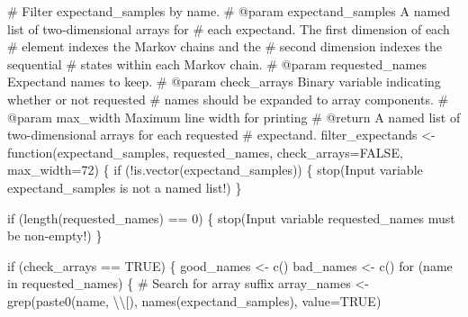 \documentclass[
  letterpaper,
  DIV=11,
  numbers=noendperiod]{scrartcl}
\newenvironment{Shaded}{\begin{snugshade}}{\end{snugshade}}
\newcommand{\CharTok}[1]{\textcolor[rgb]{0.13,0.47,0.30}{#1}}
\newcommand{\CommentTok}[1]{\textcolor[rgb]{0.37,0.37,0.37}{#1}}
\newcommand{\ControlFlowTok}[1]{\textcolor[rgb]{0.00,0.23,0.31}{#1}}
\newcommand{\DecValTok}[1]{\textcolor[rgb]{0.68,0.00,0.00}{#1}}
\newcommand{\KeywordTok}[1]{\textcolor[rgb]{0.00,0.23,0.31}{#1}}
\newcommand{\NormalTok}[1]{\textcolor[rgb]{0.00,0.23,0.31}{#1}}
\newcommand{\OperatorTok}[1]{\textcolor[rgb]{0.37,0.37,0.37}{#1}}
\newcommand{\StringTok}[1]{\textcolor[rgb]{0.13,0.47,0.30}{#1}}
\begin{document}
\begin{Shaded}
\begin{Highlighting}[]
\CommentTok{\# Filter \textasciigrave{}expectand\_samples\textasciigrave{} by name.}
\CommentTok{\# @param expectand\_samples A named list of two{-}dimensional arrays for}
\CommentTok{\#                          each expectand.  The first dimension of each}
\CommentTok{\#                          element indexes the Markov chains and the}
\CommentTok{\#                          second dimension indexes the sequential}
\CommentTok{\#                          states within each Markov chain.}
\CommentTok{\# @param requested\_names Expectand names to keep.}
\CommentTok{\# @param check\_arrays Binary variable indicating whether or not requested}
\CommentTok{\#                     names should be expanded to array components.}
\CommentTok{\# @param max\_width Maximum line width for printing}
\CommentTok{\# @return A named list of two{-}dimensional arrays for each requested}
\CommentTok{\#         expectand.}
\NormalTok{filter\_expectands }\OperatorTok{\textless{}{-}}\NormalTok{ function(expectand\_samples, requested\_names,}
\NormalTok{                              check\_arrays}\OperatorTok{=}\NormalTok{FALSE, max\_width}\OperatorTok{=}\DecValTok{72}\NormalTok{) \{}
  \ControlFlowTok{if}\NormalTok{ (}\OperatorTok{!}\KeywordTok{is}\NormalTok{.vector(expectand\_samples)) \{}
\NormalTok{    stop(}\StringTok{\textquotesingle{}Input variable \textasciigrave{}expectand\_samples\textasciigrave{} is not a named list!\textquotesingle{}}\NormalTok{)}
\NormalTok{  \}}
  
  \ControlFlowTok{if}\NormalTok{ (length(requested\_names) }\OperatorTok{==} \DecValTok{0}\NormalTok{) \{}
\NormalTok{    stop(}\StringTok{\textquotesingle{}Input variable \textasciigrave{}requested\_names\textasciigrave{} must be non{-}empty!\textquotesingle{}}\NormalTok{)}
\NormalTok{  \}}
  
  \ControlFlowTok{if}\NormalTok{ (check\_arrays }\OperatorTok{==}\NormalTok{ TRUE) \{}
\NormalTok{    good\_names }\OperatorTok{\textless{}{-}}\NormalTok{ c()}
\NormalTok{    bad\_names }\OperatorTok{\textless{}{-}}\NormalTok{ c()}
    \ControlFlowTok{for}\NormalTok{ (name }\KeywordTok{in}\NormalTok{ requested\_names) \{}
      \CommentTok{\# Search for array suffix}
\NormalTok{      array\_names }\OperatorTok{\textless{}{-}}\NormalTok{ grep(paste0(name, }\StringTok{\textquotesingle{}}\CharTok{\textbackslash{}\textbackslash{}}\StringTok{[\textquotesingle{}}\NormalTok{),}
\NormalTok{                          names(expectand\_samples),}
\NormalTok{                          value}\OperatorTok{=}\NormalTok{TRUE)}
      

\end{Highlighting}
\end{Shaded}
\end{document}
